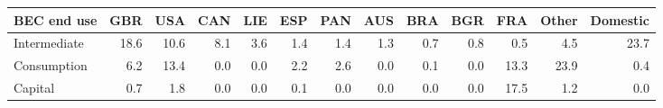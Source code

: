 \begin{tabular}{lrrrrrrrrrrrr}
\toprule
BEC end use & GBR & USA & CAN & LIE & ESP & PAN & AUS & BRA & BGR & FRA & Other & Domestic \\
\midrule
Intermediate & 18.6 & 10.6 & 8.1 & 3.6 & 1.4 & 1.4 & 1.3 & 0.7 & 0.8 & 0.5 & 4.5 & 23.7 \\
Consumption & 6.2 & 13.4 & 0.0 & 0.0 & 2.2 & 2.6 & 0.0 & 0.1 & 0.0 & 13.3 & 23.9 & 0.4 \\
Capital & 0.7 & 1.8 & 0.0 & 0.0 & 0.1 & 0.0 & 0.0 & 0.0 & 0.0 & 17.5 & 1.2 & 0.0 \\
\bottomrule
\end{tabular}
